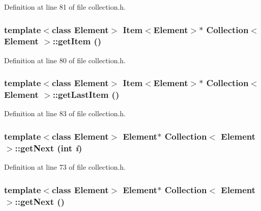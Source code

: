 Definition at line 81 of file collection.h.\hypertarget{classCollection_4b50da91af510addb076f61de9bbe34c}{
\subsubsection[{getItem}]{\setlength{\rightskip}{0pt plus 5cm}template$<$class Element$>$ {\bf Item}$<$Element$>$$\ast$ {\bf Collection}$<$ Element $>$::getItem ()}}
\label{classCollection_4b50da91af510addb076f61de9bbe34c}




Definition at line 80 of file collection.h.\hypertarget{classCollection_a00b700b2845ae6cb655fbc4168c291e}{
\subsubsection[{getLastItem}]{\setlength{\rightskip}{0pt plus 5cm}template$<$class Element$>$ {\bf Item}$<$Element$>$$\ast$ {\bf Collection}$<$ Element $>$::getLastItem ()}}
\label{classCollection_a00b700b2845ae6cb655fbc4168c291e}




Definition at line 83 of file collection.h.\hypertarget{classCollection_d26b55661b223de57ce88c2d6a190961}{
\subsubsection[{getNext}]{\setlength{\rightskip}{0pt plus 5cm}template$<$class Element$>$ Element$\ast$ {\bf Collection}$<$ Element $>$::getNext (int {\em i})}}
\label{classCollection_d26b55661b223de57ce88c2d6a190961}




Definition at line 73 of file collection.h.\hypertarget{classCollection_b26674c8b7ed8867faafa6d6456fffd6}{
\subsubsection[{getNext}]{\setlength{\rightskip}{0pt plus 5cm}template$<$class Element$>$ Element$\ast$ {\bf Collection}$<$ Element $>$::getNext ()}}
\label{classCollection_b26674c8b7ed8867faafa6d6456fffd6}




